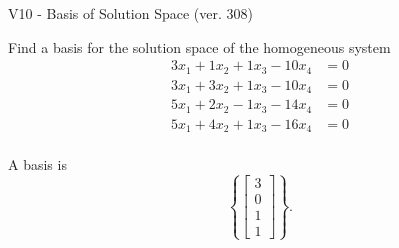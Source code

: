 \begin{exercise}
  \begin{exerciseTitle}V10 - Basis of Solution Space (ver. 308)\end{exerciseTitle}
  \begin{exerciseStatement}
    Find a basis for the solution space of the homogeneous system 
\begin{align*}
 3 x_ 1 + 1 x_ 2 + 1 x_ 3 -10 x_ 4 &= 0  \\ 
  3 x_ 1 + 3 x_ 2 + 1 x_ 3 -10 x_ 4 &= 0  \\ 
  5 x_ 1 + 2 x_ 2 -1 x_ 3 -14 x_ 4 &= 0  \\ 
  5 x_ 1 + 4 x_ 2 + 1 x_ 3 -16 x_ 4 &= 0  \\ 
 \end{align*}


 
  \end{exerciseStatement}

  \begin{exerciseAnswer}
   A basis is   
\[\left\{\left[\begin{array}{c}
3 \\
0 \\
1 \\
1
\end{array}\right]\right\}.\]

  


  \end{exerciseAnswer}
\end{exercise}